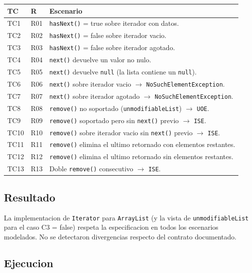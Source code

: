 \documentclass[12pt,a4paper]{article}
\begin{document}
\begin{longtable}{@{}p{1cm}p{2cm}p{9.5cm}@{}}
\toprule
\textbf{TC} & \textbf{R} & \textbf{Escenario} \\
\midrule
\endhead
TC1  & R01 & \texttt{hasNext()} = true sobre iterador con datos. \\
TC2  & R02 & \texttt{hasNext()} = false sobre iterador vacio. \\
TC3  & R03 & \texttt{hasNext()} = false sobre iterador agotado. \\
TC4  & R04 & \texttt{next()} devuelve un valor no nulo. \\
TC5  & R05 & \texttt{next()} devuelve \texttt{null} (la lista contiene un \texttt{null}). \\
TC6  & R06 & \texttt{next()} sobre iterador vacio $\rightarrow$ \texttt{NoSuchElementException}. \\
TC7  & R07 & \texttt{next()} sobre iterador agotado $\rightarrow$ \texttt{NoSuchElementException}. \\
TC8  & R08 & \texttt{remove()} no soportado (\texttt{unmodifiableList}) $\rightarrow$ \texttt{UOE}. \\
TC9  & R09 & \texttt{remove()} soportado pero sin \texttt{next()} previo $\rightarrow$ \texttt{ISE}. \\
TC10 & R10 & \texttt{remove()} sobre iterador vacio sin \texttt{next()} previo $\rightarrow$ \texttt{ISE}. \\
TC11 & R11 & \texttt{remove()} elimina el ultimo retornado con elementos restantes. \\
TC12 & R12 & \texttt{remove()} elimina el ultimo retornado sin elementos restantes. \\
TC13 & R13 & Doble \texttt{remove()} consecutivo $\rightarrow$ \texttt{ISE}. \\
\bottomrule
\end{longtable}

\subsection{Resultado}

La implementacion de \texttt{Iterator} para \texttt{ArrayList} (y la vista de
\texttt{unmodifiableList} para el caso C3 = false) respeta la especificacion en todos los
escenarios modelados. No se detectaron divergencias respecto del contrato documentado.

\subsection{Ejecucion}
\end{document}
